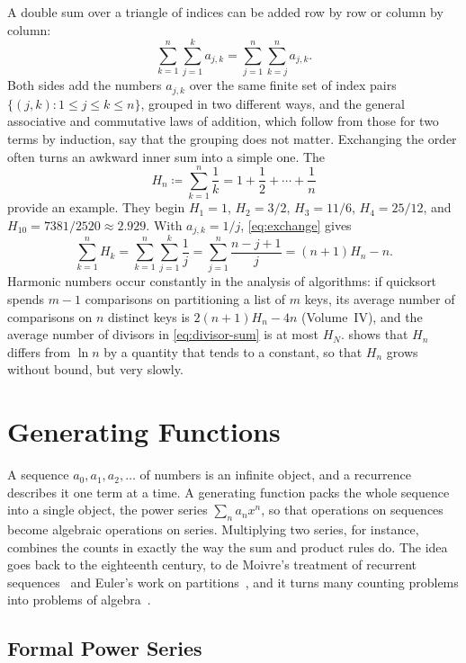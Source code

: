 A double sum over a triangle of indices can be added row by row or column by column:
\begin{equation}
\sum_{k=1}^{n}\sum_{j=1}^{k}a_{j,k}=\sum_{j=1}^{n}\sum_{k=j}^{n}a_{j,k} .
\label{eq:exchange}
\end{equation}
Both sides add the numbers $a_{j,k}$ over the same finite set of index pairs $\{(j,k): 1\le j\le k\le n\}$, grouped in two different ways, and the general associative and commutative laws of addition, which follow from those for two terms by induction, say that the grouping does not matter. Exchanging the order often turns an awkward inner sum into a simple one. The 
\[
H_n\coloneqq\sum_{k=1}^{n}\frac1k=1+\frac12+\cdots+\frac1n
\]
provide an example. They begin $H_1=1$, $H_2=3/2$, $H_3=11/6$, $H_4=25/12$, and $H_{10}=7381/2520\approx2.929$. With $a_{j,k}=1/j$, \eqref{eq:exchange} gives
\[
\sum_{k=1}^{n}H_k=\sum_{k=1}^{n}\sum_{j=1}^{k}\frac1j=\sum_{j=1}^{n}\frac{n-j+1}{j}=(n+1)H_n-n .
\]
Harmonic numbers occur constantly in the analysis of algorithms: if quicksort spends $m-1$ comparisons on partitioning a list of $m$ keys, its average number of comparisons on $n$ distinct keys is $2(n+1)H_n-4n$ (Volume~IV), and the average number of divisors in \eqref{eq:divisor-sum} is at most $H_N$.  shows that $H_n$ differs from $\ln n$ by a quantity that tends to a constant, so that $H_n$ grows without bound, but very slowly.

\section{Generating Functions}
\label{sec:gf}

A sequence $a_0,a_1,a_2,\ldots$ of numbers is an infinite object, and a recurrence describes it one term at a time. A generating function packs the whole sequence into a single object, the power series $\sum_na_nx^n$, so that operations on sequences become algebraic operations on series. Multiplying two series, for instance, combines the counts in exactly the way the sum and product rules do. The idea goes back to the eighteenth century, to de Moivre's treatment of recurrent sequences~\cite[Sect.~1.2.8]{knuth1997taocp1} and Euler's work on partitions~\cite{andrews1976partitions}, and it turns many counting problems into problems of algebra~\cite{wilf2006,flajolet2009}.

\subsection{Formal Power Series}

